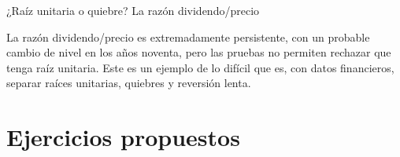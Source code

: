 \begin{ejresuelto}{¿Raíz unitaria o quiebre? La razón dividendo/precio}
\begin{conclusion}
La razón dividendo/precio es extremadamente persistente, con un probable cambio de nivel en los años noventa,
pero las pruebas no permiten rechazar que tenga raíz unitaria. Este es un ejemplo de lo difícil que es, con
datos financieros, separar raíces unitarias, quiebres y reversión lenta.
\end{conclusion}
\end{ejresuelto}

\section{Ejercicios propuestos}

